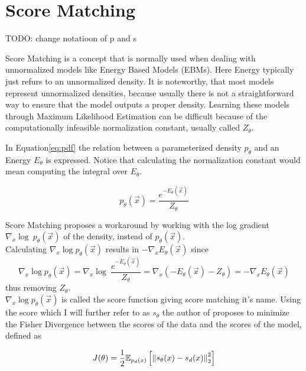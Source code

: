 \section{Score Matching}
\label{sec:sm}

TODO: change notatioon of p and s

Score Matching \cite{sm} is a concept that is normally used when dealing with unnormalized models like Energy Based Models (EBMs). Here 
Energy typically just refurs to an unnormalized density. It is noteworthy, that most models represent unnormalized densities, 
because usually there is not a straightforward way to ensure that the model outputs a proper density.
Learning these models through Maximum Likelihood Estimation can be difficult because of the computationally infeasible normalization 
constant, usually called $Z_\theta$.


In Equation\ref{eq:pdf} the relation between a parameterized density $p_\theta$ and an Energy $E_\theta$ is expressed. Notice that calculating the normalization constant would 
mean computing the integral over $E_\theta$.

\begin{equation}
    \label{eq:pdf}
    p_\theta(\vec x) = \frac{e^{-E_\theta(\vec x)}}{Z_\theta}
\end{equation}

Score Matching proposes a workaround by working with the log gradient $\nabla_x \log \ p_\theta(\vec x)$ of the density, 
instead of $p_\theta(\vec x)$. \\

Calculating $\nabla_x \log p_\theta(\vec x)$ results in $- \nabla_x E_\theta(\vec x)$ since 
\[\nabla_x \log p_\theta(\vec x) = \nabla_x \log \ \frac{e^{- E_\theta(\vec x)}}{Z_\theta} = \nabla_x \left( - E_\theta(\vec x) - {Z_\theta} \right) = - \nabla_x E_\theta(\vec x)\]
thus removing $Z_\theta$.\\

$\nabla_x \log p_\theta(\vec x)$ is called the score function giving score matching it's name.
Using the score which I will further refer to as $s_\theta$ the author of \cite{sm} proposes to minimize the Fisher Divergence between 
the scores of the data and the scores of the model, defined as 

\begin{equation}
    \label{eq:fisher}
    J(\theta) = \frac{1}{2} \mathbb{E}_{p_d(x)} \left[ \left\lVert s_\theta(x) - s_d(x)\right\rVert^2_2 \right]
\end{equation}

